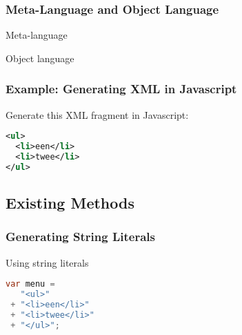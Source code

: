 \documentclass{beamer}
\begin{document}


\begin{frame}

  \frametitle{Meta-Language and Object Language}

  \begin{block}{Meta-language}
  \end{block}

  \begin{block}{Object language}
  \end{block}

\end{frame}


\begin{frame}[fragile]

  \frametitle{Example: Generating XML in Javascript}

  Generate this XML fragment in Javascript:

  \begin{lstlisting}[language=XML]
<ul>
  <li>een</li>
  <li>twee</li>
</ul>
  \end{lstlisting}

\end{frame}


\subsection{Existing Methods}

\begin{frame}[fragile]

  \frametitle{Generating String Literals}

  \begin{block}{Using string literals}
    \begin{lstlisting}[language=Java]
var menu =
   "<ul>"
 + "<li>een</li>"
 + "<li>twee</li>"
 + "</ul>";
    \end{lstlisting}
  \end{block}

\end{frame}
\end{document}

